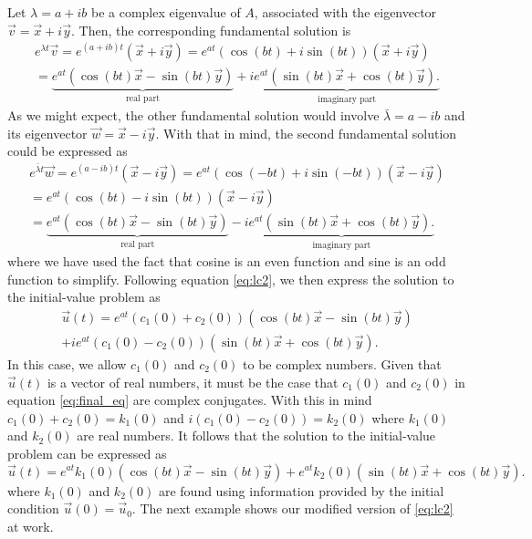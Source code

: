 \documentclass[../book.tex]{subfiles}
\begin{document}
Let \(\lambda = a+i b\) be a complex eigenvalue of \(A\), associated with the eigenvector \(\vec{v} = \vec{x} + i \vec{y}\). Then, the corresponding fundamental solution is
\begin{multline}\label{eq:sys-21}
  e^{\lambda t}
   \vec{v}
  =
  e^{(a+i b)t}  (\vec{x}+i \vec{y})
  =
  e^{a t} (\cos (bt) + i \sin (bt) )(\vec{x}+i \vec{y})
  \\[1ex]
  =
  \underbrace{
    e^{a t} ( \cos (bt) \vec{x} - \sin (bt) \vec{y} )
  }_{\text{real part}}
  +
  i 
  \underbrace{
    e^{a t} ( \sin (bt) \vec{x} + \cos (bt) \vec{y} ).
  }_{\text{imaginary part}}
\end{multline}
As we might expect, the other fundamental solution would involve \(\bar \lambda = a - i b\) and its eigenvector \(\vec{w} = \vec{x} - i \vec{y}\). With that in mind, the second fundamental solution could be expressed as
\begin{multline}\label{eq:sys-22}
  e^{\bar \lambda t}
   \vec{w}
  =
  e^{(a-i b)t}  (\vec{x}-i \vec{y})
  =
  e^{a t} (\cos (-bt) + i \sin (-bt) )(\vec{x}-i \vec{y})
  \\[1ex]
  =
  e^{a t} (\cos (bt) - i \sin (bt) )(\vec{x}-i \vec{y})
  \\[1ex]
  =
  \underbrace{
    e^{a t} ( \cos (bt) \vec{x} - \sin (bt) \vec{y} )
  }_{\text{real part}}
  -
  i 
  \underbrace{
    e^{a t} ( \sin (bt) \vec{x} + \cos (bt) \vec{y} ).
  }_{\text{imaginary part}}
\end{multline}
where we have used the fact that cosine is an even function and sine is an odd function to simplify. Following equation \eqref{eq:lc2}, we then express the solution to the initial-value problem as
\begin{multline} \label{eq:final_eq}
  \vec{u}(t)
  =
  e^{a t}
  (c_1(0) + c_2(0))
  \left(
    \cos(bt) \vec{x} - \sin(bt) \vec{y}
  \right)
  \\+
  i e^{at} (c_1(0) - c_2(0)) 
  \left(
    \sin(bt) \vec{x} + \cos(bt) \vec{y}
  \right).
\end{multline}
In this case, we allow \(c_1(0)\) and \(c_2(0)\) to be complex numbers. Given that \(\vec{u}(t)\) is a vector of real numbers, it must be the case that \(c_1(0)\) and \(c_2(0)\) in equation \eqref{eq:final_eq} are complex conjugates. With this in mind \(c_1(0) + c_2(0) = k_1(0)\) and \(i ( c_1(0) - c_2(0)) = k_2(0)\) where \(k_1(0)\) and \(k_2(0)\) are real numbers. It follows that the solution to the initial-value problem can be expressed as
\begin{equation}\label{eq:sys-23}
\vec{u}(t)
=
e^{a t} 
k_1(0)
\left(
  \cos(bt) \vec{x} - \sin(bt) \vec{y}
\right)
+
e^{at} k_2(0) 
\left(
  \sin(bt) \vec{x} + \cos(bt) \vec{y}
\right).
\end{equation}
where \(k_1(0)\) and \(k_2(0)\) are found using information provided by the initial condition \(\vec{u}(0) = \vec{u}_0\). The next example shows our modified version of \eqref{eq:lc2} at work.
\end{document}

